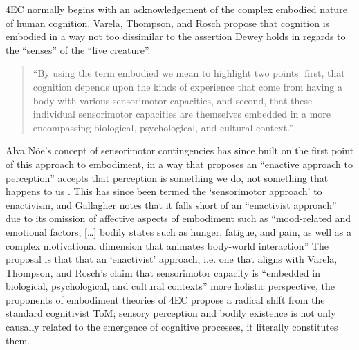 4EC normally begins with an acknowledgement of the complex embodied nature of human cognition. Varela, Thompson, and Rosch propose that cognition is embodied in a way not too dissimilar to the assertion Dewey holds in regards to the “senses” of the “live creature”.
\begin{quote}
    “By using the term embodied we mean to highlight two points: first, that cognition depends upon the kinds of experience that come from having a body with various sensorimotor capacities, and second, that these individual sensorimotor capacities are themselves embedded in a more encompassing biological, psychological, and cultural context.” \citeyearpar[pp. 172-173]{varela1993}
\end{quote}
Alva Nöe’s concept of sensorimotor contingencies has since built on the first point of this approach to embodiment, in a way that proposes an “enactive approach to perception” accepts that perception is something we do, not something that happens to us \citep{noe2004}. This has since been termed the ‘sensorimotor approach’ to enactivism, and Gallagher notes that it falls short of an “enactivist approach” due to its omission of affective aspects of embodiment such as “mood-related and emotional factors, […] bodily states such as hunger, fatigue, and pain, as well as a complex motivational dimension that animates body-world interaction”  \citep[p. 150]{gallagher2017} The proposal is that that an ‘enactivist’ approach, i.e. one that aligns with Varela, Thompson, and Rosch’s claim that sensorimotor capacity is “embedded in biological, psychological, and cultural contexts” more holistic perspective, the proponents of embodiment theories of 4EC propose a radical shift from the standard cognitivist ToM; sensory perception and bodily existence is not only causally related to the emergence of cognitive processes, it literally constitutes them. 

